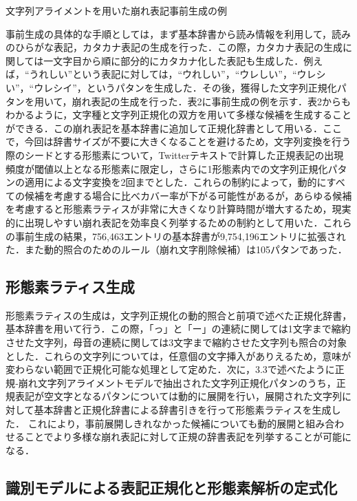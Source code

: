 \documentclass[japanese]{jnlp_1.4}
\begin{document}
\begin{table}[b]
\caption{文字列アライメントを用いた崩れ表記事前生成の例}
\label{tab:seisei}

\end{table}

事前生成の具体的な手順としては，まず基本辞書から読み情報を利用して，読みのひらがな表記，カタカナ表記の生成を行った．この際，カタカナ表記の生成に関しては一文字目から順に部分的にカタカナ化した表記も生成した．例えば，``うれしい''という表記に対しては，``ウれしい''，``ウレしい''，``ウレシい''，``ウレシイ''，というパタンを生成した．その後，獲得した文字列正規化パタンを用いて，崩れ表記の生成を行った．表2に事前生成の例を示す．表2からもわかるように，文字種と文字列正規化の双方を用いて多様な候補を生成することができる．この崩れ表記を基本辞書に追加して正規化辞書として用いる．ここで，今回は辞書サイズが不要に大きくなることを避けるため，文字列変換を行う際のシードとする形態素について，Twitterテキストで計算した正規表記の出現頻度が閾値以上となる形態素に限定し，さらに1形態素内での文字列正規化パタンの適用による文字変換を2回までとした．これらの制約によって，動的にすべての候補を考慮する場合に比べカバー率が下がる可能性があるが，あらゆる候補を考慮すると形態素ラティスが非常に大きくなり計算時間が増大するため，現実的に出現しやすい崩れ表記を効率良く列挙するための制約として用いた．これらの事前生成の結果，756,463エントリの基本辞書が9,754,196エントリに拡張された．また動的照合のためのルール（崩れ文字削除候補）は105パタンであった．


\subsection{形態素ラティス生成}

形態素ラティスの生成は，文字列正規化の動的照合と前項で述べた正規化辞書，基本辞書を用いて行う．この際，「っ」と「ー」の連続に関しては1文字まで縮約させた文字列，母音の連続に関しては3文字まで縮約させた文字列も照合の対象とした．これらの文字列については，任意個の文字挿入がありえるため，意味が変わらない範囲で正規化可能な処理として定めた．次に，3.3で述べたように正規‐崩れ文字列アライメントモデルで抽出された文字列正規化パタンのうち，正規表記が空文字となるパタンについては動的に展開を行い，展開された文字列に対して基本辞書と正規化辞書による辞書引きを行って形態素ラティスを生成した．
これにより，事前展開しきれなかった候補についても動的展開と組み合わせることでより多様な崩れ表記に対して正規の辞書表記を列挙することが可能になる．


\subsection{識別モデルによる表記正規化と形態素解析の定式化}
\end{document}
